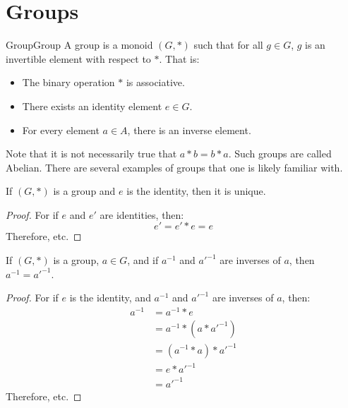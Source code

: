 \section{Groups}
    \begin{fdefinition}{Group}{Group}
        A group is a \gls{monoid} $(G,*)$ such that for all $g\in{G}$, $g$ is an
        \gls{invertible element} with respect to $*$. That is:
        \begin{itemize}
            \item The binary operation $*$ is associative.
            \item There exists an identity element $e\in{G}$.
            \item For every element $a\in{A}$, there is an inverse element.
        \end{itemize}
    \end{fdefinition}
    Note that it is not necessarily true that $a*b=b*a$. Such groups are called
    Abelian. There are several examples of groups that one is likely familiar
    with.
    \begin{theorem}
        If $(G,*)$ is a group and $e$ is the identity, then it is unique.
    \end{theorem}
    \begin{proof}
        For if $e$ and $e'$ are identities, then:
        \begin{equation}
            e'=e'*e=e
        \end{equation}
        Therefore, etc.
    \end{proof}
    \begin{theorem}
        \label{thm:Group_Theory_Inverses_Are_Unique}
        If $(G,*)$ is a group, $a\in{G}$, and if $a^{-1}$ and
        $a'^{-1}$ are inverses of $a$, then $a^{-1}=a'^{-1}$.
    \end{theorem}
    \begin{proof}
        For if $e$ is the identity, and
        $a^{-1}$ and $a'^{-1}$ are inverses of $a$, then:
        \begin{align}
            a^{-1}&=a^{-1}*e
            \tag{Identitive Property}\\
            &=a^{-1}*(a*a'^{-1})
            \tag{Inverse Property}\\
            &=(a^{-1}*a)*a'^{-1}
            \tag{Associative Property}\\
            &=e*a'^{-1}
            \tag{Inverse Property}\\
            &=a'^{-1}
            \tag{Identitive Property}
        \end{align}
        Therefore, etc.
    \end{proof}
